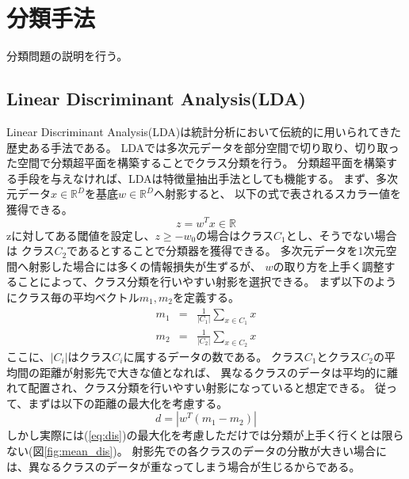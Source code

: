 \section{\mc 分類手法}
分類問題の説明を行う。

\subsection{\rm Linear Discriminant Analysis(LDA)}
\label{subsec:LDA}
Linear Discriminant Analysis(LDA)は統計分析において伝統的に用いられてきた歴史ある手法である。
LDAでは多次元データを部分空間で切り取り、切り取った空間で分類超平面を構築することでクラス分類を行う。
分類超平面を構築する手段を与えなければ、LDAは特徴量抽出手法としても機能する。
まず、多次元データ\(x\in \mathbb R^D\)を基底\(w \in \mathbb R^D\)へ射影すると、
以下の式で表されるスカラー値を獲得できる。
\begin{equation}
    z = w^Tx \in \mathbb R
\end{equation}
zに対してある閾値を設定し、\(z \geq -w_0\)の場合はクラス\(C_1\)とし、そうでない場合は
クラス\(C_2\)であるとすることで分類器を獲得できる。
多次元データを1次元空間へ射影した場合には多くの情報損失が生ずるが、
\(w\)の取り方を上手く調整することによって、クラス分類を行いやすい射影を選択できる。
まず以下のようにクラス毎の平均ベクトル\(m_1,m_2\)を定義する。
\begin{eqnarray}
    m_{1} & = & \frac{1}{|C_1|}\sum_{x\in C_1}x  \\
    m_{2} & = & \frac{1}{|C_2|}\sum_{x\in C_2}x
\end{eqnarray}
ここに、\(|C_i|\)はクラス\(C_i\)に属するデータの数である。
クラス\(C_1\)とクラス\(C_2\)の平均間の距離が射影先で大きな値となれば、
異なるクラスのデータは平均的に離れて配置され、クラス分類を行いやすい射影になっていると想定できる。
従って、まずは以下の距離の最大化を考慮する。
\begin{equation}
    d=|w^T(m_1-m_2)|
    \label{eq:dis}
\end{equation}
しかし実際には(\ref{eq:dis})の最大化を考慮しただけでは分類が上手く行くとは限らない(図\ref{fig:mean_dis})。
射影先での各クラスのデータの分散が大きい場合には、異なるクラスのデータが重なってしまう場合が生じるからである。
